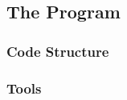 \documentclass[aps,pra,english,notitlepage,reprint,nofootinbib]{revtex4-1}  %
\begin{document}
\subsection{The Program}\label{subsec:program}
\subsubsection{Code Structure}\label{subsubsec:codestructure}

\subsubsection{Tools}\label{subsubsec:tools}
\end{document}

